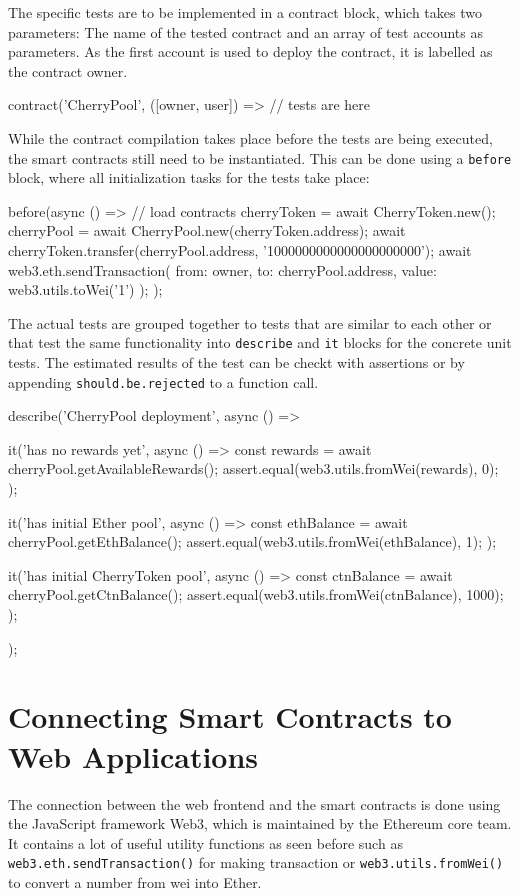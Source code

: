 The specific tests are to be implemented in a contract block, which takes two parameters: The name of the tested contract and an array of test accounts as parameters. As the first account is used to deploy the contract, it is labelled as the contract owner.

\begin{GenericCode}
contract('CherryPool', ([owner, user]) => {
	// tests are here
}	
\end{GenericCode}

While the contract compilation takes place before the tests are being executed, the smart contracts still need to be instantiated. This can be done using a \texttt{before} block, where all initialization tasks for the tests take place:

\begin{GenericCode}
before(async () => {
  // load contracts
  cherryToken = await CherryToken.new();
  cherryPool = await CherryPool.new(cherryToken.address);
  await cherryToken.transfer(cherryPool.address, '1000000000000000000000');
  await web3.eth.sendTransaction({ from: owner, to: cherryPool.address, value: web3.utils.toWei('1') });
});	
\end{GenericCode}

The actual tests are grouped together to tests that are similar to each other or that test the same functionality into \texttt{describe} and \texttt{it} blocks for the concrete unit tests. The estimated results of the test can be checkt with assertions or by appending \texttt{should.be.rejected} to a function call.

\begin{GenericCode}
describe('CherryPool deployment', async () => {
  it('has no rewards yet', async () => {
    const rewards = await cherryPool.getAvailableRewards();
    assert.equal(web3.utils.fromWei(rewards), 0);
  });

  it('has initial Ether pool', async () => {
    const ethBalance = await cherryPool.getEthBalance();
    assert.equal(web3.utils.fromWei(ethBalance), 1);
  });

  it('has initial CherryToken pool', async () => {
    const ctnBalance = await cherryPool.getCtnBalance();
    assert.equal(web3.utils.fromWei(ctnBalance), 1000);
  });
});
\end{GenericCode}

\section{Connecting Smart Contracts to Web Applications}
The connection between the web frontend and the smart contracts is done using the JavaScript framework Web3\cite{Web3}, which is maintained by the Ethereum core team. It contains a lot of useful utility functions as seen before such as \texttt{web3.eth.sendTransaction()} for making transaction or \texttt{web3.utils.fromWei()} to convert a number from wei into Ether.

